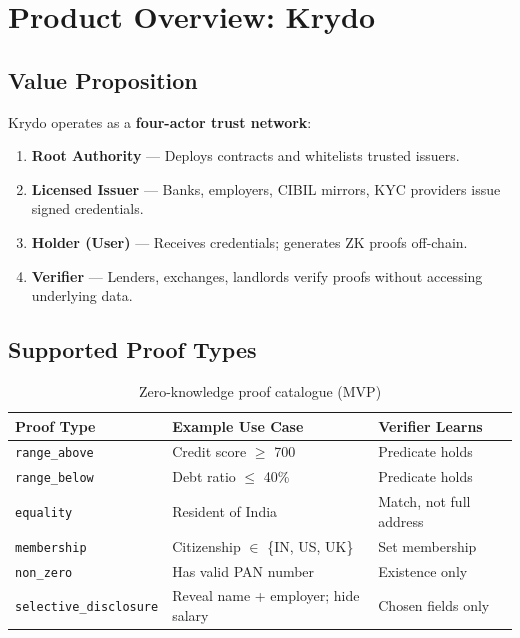 \documentclass[11pt,a4paper]{article}
\newcommand{\krydo}{\textsf{Krydo}}
\begin{document}
\section{Product Overview: \krydo{}}

\subsection{Value Proposition}

\krydo{} operates as a \textbf{four-actor trust network}:

\begin{enumerate}
  \item \textbf{Root Authority} --- Deploys contracts and whitelists trusted issuers.
  \item \textbf{Licensed Issuer} --- Banks, employers, CIBIL mirrors, KYC providers issue signed credentials.
  \item \textbf{Holder (User)} --- Receives credentials; generates ZK proofs off-chain.
  \item \textbf{Verifier} --- Lenders, exchanges, landlords verify proofs without accessing underlying data.
\end{enumerate}

\subsection{Supported Proof Types}

\begin{table}[H]
  \centering
  \caption{Zero-knowledge proof catalogue (MVP)}
  \renewcommand{\arraystretch}{1.2}
  \begin{tabularx}{\textwidth}{@{}l X l@{}}
    \toprule
    \rowcolor{TableHead}\color{white}\textbf{Proof Type} & \color{white}\textbf{Example Use Case} & \color{white}\textbf{Verifier Learns} \\
    \midrule
    \texttt{range\_above} & Credit score $\geq$ 700 & Predicate holds \\
    \texttt{range\_below} & Debt ratio $\leq$ 40\% & Predicate holds \\
    \texttt{equality} & Resident of India & Match, not full address \\
    \texttt{membership} & Citizenship $\in$ \{IN, US, UK\} & Set membership \\
    \texttt{non\_zero} & Has valid PAN number & Existence only \\
    \texttt{selective\_disclosure} & Reveal name + employer; hide salary & Chosen fields only \\
    \bottomrule
  \end{tabularx}
\end{table}
\end{document}
